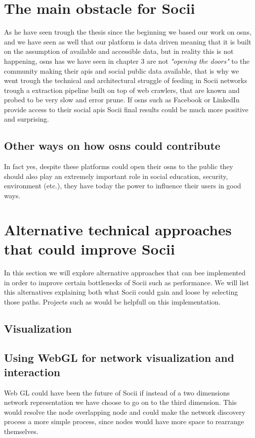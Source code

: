 \section{The main obstacle for Socii}
As he have seen trough the thesis since the beginning we based our work on \glspl{osn}, and we have seen as well that our platform is data driven meaning that it is built on the assumption of available and accessible data, but in reality this is not happening, \glspl{osn} has we have seen in chapter 3 are not \textit{"opening the doors"} to the community making their \glspl{api} and social public data available, that is why we went trough the technical and architectural struggle of feeding in Socii networks trough a extraction pipeline built on top of web crawlers, that are known and probed to be very slow and error prune. If \glspl{osn} such as Facebook or LinkedIn provide access to their social \glspl{api} Socii final results could be much more positive and surprising.

\subsection*{Other ways on how \glspl{osn} could contribute}
In fact yes, despite these platforms could open their \glspl{osn} to the public they should also play an extremely important role in social education, security, environment (etc.), they have today the power to influence their users in good ways.

\section{Alternative technical approaches that could improve Socii}
In this section we will explore alternative approaches that can bee implemented in order to improve certain bottlenecks of Socii such as performance. We will list this alternatives explaining both what Socii could gain and loose by selecting those paths. Projects such as \citep{graphosaurus} would be helpfull on this implementation.

\subsection{Visualization}

\subsection*{Using WebGL for network visualization and interaction}
Web GL \citep{marrin2011webgl} could have been the future of Socii if instead of a two dimensions network representation we have choose to go on to the third dimension. This would resolve the node overlapping node and could make the network discovery process a more simple process, since nodes would have more space to rearrange themselves.

